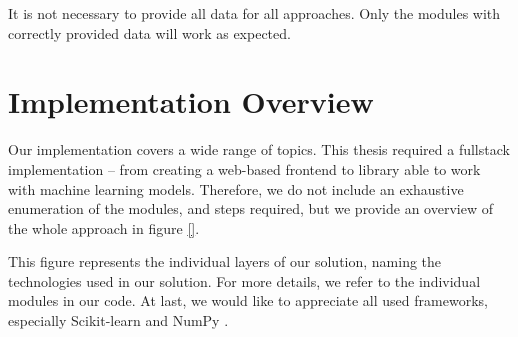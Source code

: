 It is not necessary to provide all data for all approaches. Only the modules with correctly provided data will work as expected.






























\chapter{Implementation Overview}
\label{ch:developers_guide}
\label{ch:programmers_guide}

Our implementation covers a wide range of topics. This thesis required a fullstack implementation -- from creating a web-based frontend to library able to work with machine learning models. Therefore, we do not include an exhaustive enumeration of the modules, and steps required, but we provide an overview of the whole approach in figure \ref{}.

This figure represents the individual layers of our solution, naming the technologies used in our solution. For more details, we refer to the individual modules in our code. At last, we would like to appreciate all used frameworks, especially Scikit-learn \citep{pedregosa2011scikit} and NumPy \citep{van2011numpy}.






